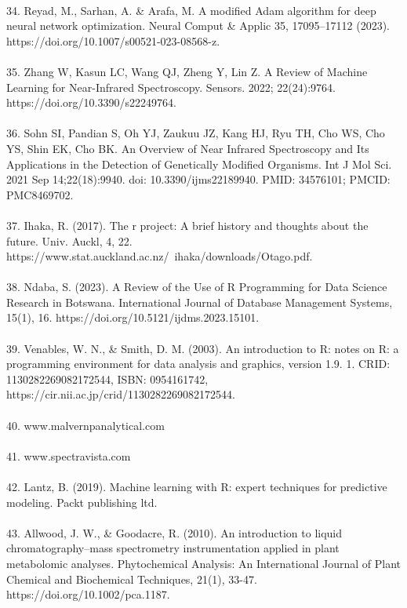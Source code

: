 \documentclass[12pt,a4paper]{report}
\begin{document}
\\
34. Reyad, M., Sarhan, A. \& Arafa, M. A modified Adam algorithm for deep neural network optimization. Neural Comput \& Applic 35, 17095–17112 (2023). https://doi.org/10.1007/s00521-023-08568-z.\\
\\
35. Zhang W, Kasun LC, Wang QJ, Zheng Y, Lin Z. A Review of Machine Learning for Near-Infrared Spectroscopy. Sensors. 2022; 22(24):9764. https://doi.org/10.3390/s22249764. \\
\\
36. Sohn SI, Pandian S, Oh YJ, Zaukuu JZ, Kang HJ, Ryu TH, Cho WS, Cho YS, Shin EK, Cho BK. An Overview of Near Infrared Spectroscopy and Its Applications in the Detection of Genetically Modified Organisms. Int J Mol Sci. 2021 Sep 14;22(18):9940. doi: 10.3390/ijms22189940. PMID: 34576101; PMCID: PMC8469702.\\
\\
37. Ihaka, R. (2017). The r project: A brief history and thoughts about the future. Univ. Auckl, 4, 22. https://www.stat.auckland.ac.nz/~ihaka/downloads/Otago.pdf. \\
\\
38. Ndaba, S. (2023). A Review of the Use of R Programming for Data Science Research in Botswana. International Journal of Database Management Systems, 15(1), 16. https://doi.org/10.5121/ijdms.2023.15101. \\
\\
39. Venables, W. N., \& Smith, D. M. (2003). An introduction to R: notes on R: a programming environment for data analysis and graphics, version 1.9. 1. CRID: 1130282269082172544, ISBN: 0954161742, https://cir.nii.ac.jp/crid/1130282269082172544. \\
\\
40. www.malvernpanalytical.com \\
\\
41. www.spectravista.com \\
\\
42. Lantz, B. (2019). Machine learning with R: expert techniques for predictive modeling. Packt publishing ltd. \\
\\
43. Allwood, J. W., \& Goodacre, R. (2010). An introduction to liquid chromatography–mass spectrometry instrumentation applied in plant metabolomic analyses. Phytochemical Analysis: An International Journal of Plant Chemical and Biochemical Techniques, 21(1), 33-47. https://doi.org/10.1002/pca.1187. \\
\end{document}

